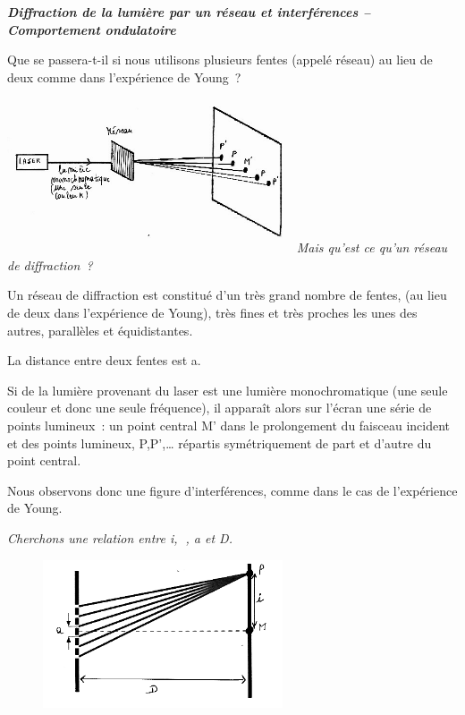 \emph{\textbf{Diffraction de la lumière par un réseau et interférences
-- Comportement ondulatoire}}

Que se passera-t-il si nous utilisons plusieurs fentes (appelé réseau)
au lieu de deux comme dans l'expérience de Young~?

\includegraphics[width=8.565cm,height=4.546cm]{Pictures/10000001000002550000013DE02531D3FDE95D32.png}\emph{Mais
qu'est ce qu'un réseau de diffraction~? }

Un réseau de diffraction est constitué d'un très grand nombre de fentes,
(au lieu de deux dans l'expérience de Young), très fines et très proches
les unes des autres, parallèles et équidistantes.

La distance entre deux fentes est a.

Si de la lumière provenant du laser est une lumière monochromatique (une
seule couleur et donc une seule fréquence), il apparaît alors sur
l'écran une série de points lumineux~: un point central M' dans le
prolongement du faisceau incident et des points lumineux, P,P',\ldots{}
répartis symétriquement de part et d'autre du point central.

Nous observons donc une figure d'interférences, comme dans le cas de
l'expérience de Young.

\emph{Cherchons une relation entre i, , a et D. }

\begin{figure}
\centering
\includegraphics[width=7.086cm,height=4.389cm]{Pictures/10000001000001C400000118A4F6B6134DC391C7.png}
\caption{}
\end{figure}


